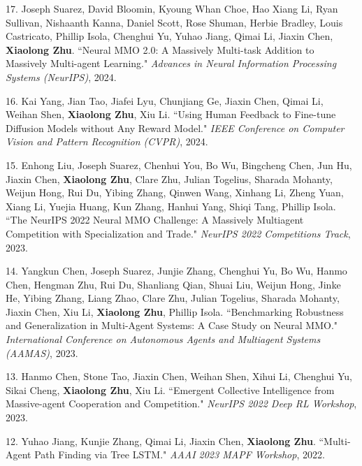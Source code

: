 \documentclass[10pt]{article}
\makeatletter
\newlength{\bibhang}
\newlength{\bibsep}
 {\@listi \global\bibsep\itemsep \global\advance\bibsep by\parsep}
\newenvironment{bibsection}%
        {\vspace{\itemsep}\begin{list}{}{%
       \setlength{\leftmargin}{\bibhang}%
       \setlength{\itemsep}{\bibsep}%
       \setlength{\parsep}{\z@}%
        \setlength{\partopsep}{0pt}%
        \setlength{\topsep}{0pt}}}
        {\end{list}\vspace{\itemsep}}
\makeatother
\begin{document}
\begin{bibsection}
    \item[17.]Joseph Suarez, David Bloomin, Kyoung Whan Choe, Hao Xiang Li, Ryan Sullivan, Nishaanth Kanna, Daniel Scott, Rose Shuman, Herbie Bradley, Louis Castricato, Phillip Isola, Chenghui Yu, Yuhao Jiang, Qimai Li, Jiaxin Chen, \textbf{Xiaolong Zhu}. ``Neural MMO 2.0: A Massively Multi-task Addition to Massively Multi-agent Learning." \emph{Advances in Neural Information Processing Systems (NeurIPS)}, 2024.

    \item[16.]Kai Yang, Jian Tao, Jiafei Lyu, Chunjiang Ge, Jiaxin Chen, Qimai Li, Weihan Shen, \textbf{Xiaolong Zhu}, Xiu Li. ``Using Human Feedback to Fine-tune Diffusion Models without Any Reward Model." \emph{IEEE Conference on Computer Vision and Pattern Recognition (CVPR)}, 2024.

    \item[15.]Enhong Liu, Joseph Suarez, Chenhui You, Bo Wu, Bingcheng Chen, Jun Hu, Jiaxin Chen, \textbf{Xiaolong Zhu}, Clare Zhu, Julian Togelius, Sharada Mohanty, Weijun Hong, Rui Du, Yibing Zhang, Qinwen Wang, Xinhang Li, Zheng Yuan, Xiang Li, Yuejia Huang, Kun Zhang, Hanhui Yang, Shiqi Tang, Phillip Isola. ``The NeurIPS 2022 Neural MMO Challenge: A Massively Multiagent Competition with Specialization and Trade." \emph{NeurIPS 2022 Competitions Track}, 2023.
  
    \item[14.]Yangkun Chen, Joseph Suarez, Junjie Zhang, Chenghui Yu, Bo Wu, Hanmo Chen, Hengman Zhu, Rui Du, Shanliang Qian, Shuai Liu, Weijun Hong, Jinke He, Yibing Zhang, Liang Zhao, Clare Zhu, Julian Togelius, Sharada Mohanty, Jiaxin Chen, Xiu Li, \textbf{Xiaolong Zhu}, Phillip Isola. ``Benchmarking Robustness and Generalization in Multi-Agent Systems: A Case Study on Neural MMO." \emph{International Conference on Autonomous Agents and Multiagent Systems (AAMAS)}, 2023.

    \item[13.]Hanmo Chen, Stone Tao, Jiaxin Chen, Weihan Shen, Xihui Li, Chenghui Yu, Sikai Cheng, \textbf{Xiaolong Zhu}, Xiu Li. ``Emergent Collective Intelligence from Massive-agent Cooperation and Competition." \emph{NeurIPS 2022 Deep RL Workshop}, 2023.
  
    \item[12.]Yuhao Jiang, Kunjie Zhang, Qimai Li, Jiaxin Chen, \textbf{Xiaolong Zhu}. ``Multi-Agent Path Finding via Tree LSTM." \emph{AAAI 2023 MAPF Workshop}, 2022.
  

\end{bibsection}
\end{document}
